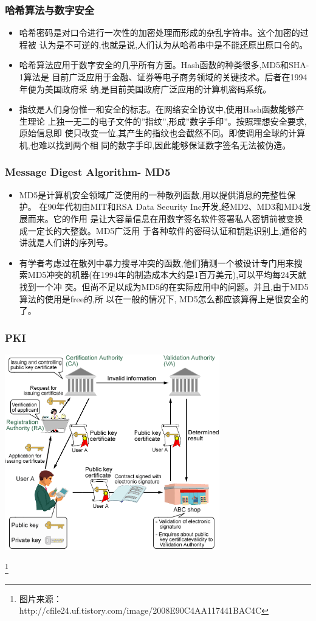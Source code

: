 \begin{frame}[fragile]
  \frametitle{哈希算法与数字安全}
  \begin{itemize}
  \item 哈希密码是对口令进行一次性的加密处理而形成的杂乱字符串。这个加密的过程被
    认为是不可逆的,也就是说,人们认为从哈希串中是不能还原出原口令的。
  \item 哈希算法应用于数字安全的几乎所有方面。Hash函数的种类很多,MD5和SHA-1算法是
    目前广泛应用于金融、证券等电子商务领域的关键技术。后者在1994年便为美国政府采
    纳,是目前美国政府广泛应用的计算机密码系统。
  \item 指纹是人们身份惟一和安全的标志。在网络安全协议中,使用Hash函数能够产生理论
    上独一无二的电子文件的''指纹'',形成''数字手印''。按照理想安全要求,原始信息即
    使只改变一位,其产生的指纹也会截然不同。即使调用全球的计算机,也难以找到两个相
    同的数字手印,因此能够保证数字签名无法被伪造。
  \end{itemize}
\end{frame}

\begin{frame}[fragile]
  \frametitle{Message Digest Algorithm- MD5}
  \begin{itemize}
  \item MD5是计算机安全领域广泛使用的一种散列函数,用以提供消息的完整性保护。
    在90年代初由MIT和RSA Data Security Inc开发,经MD2、MD3和MD4发展而来。它的作用
    是让大容量信息在用数字签名软件签署私人密钥前被变换成一定长的大整数。MD5广泛用
    于各种软件的密码认证和钥匙识别上,通俗的讲就是人们讲的序列号。
  \item 有学者考虑过在散列中暴力搜寻冲突的函数,他们猜测一个被设计专门用来搜
    索MD5冲突的机器(在1994年的制造成本大约是1百万美元),可以平均每24天就找到一个冲
    突。但尚不足以成为MD5的在实际应用中的问题。并且,由于MD5算法的使用是free的,所
    以在一般的情况下, MD5怎么都应该算得上是很安全的了。
  \end{itemize}
\end{frame}


\begin{frame}[fragile]
  \frametitle{PKI}
  \includegraphics[width=0.7\textwidth]{figs/pki.png}

  \footnote{图片来源： http://cfile24.uf.tistory.com/image/2008E90C4AA117441BAC4C}
\end{frame}

